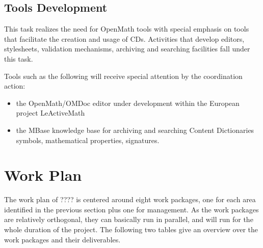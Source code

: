 \documentclass{euproposal}
\begin{document}
\subsection{Tools Development}\label{tools}

This task realizes the need for OpenMath tools with special emphasis
on tools that facilitate the creation and usage of CDs. Activities
that develop editors, stylesheets, validation mechanisms, archiving
and searching facilities fall under this task.

Tools such as the following will receive special attention by the
coordination action: 
\begin{itemize}
\item the OpenMath/OMDoc editor under development within the European project
  LeActiveMath
\item the MBase knowledge base for archiving and searching Content
  Dictionaries symbols, mathematical properties, signatures.
\end{itemize}
\section{Work Plan}

The work plan of ???? is centered around eight work packages, one for each area
identified in the previous section plus one for management. As the work packages
are relatively orthogonal, they can basically run in parallel, and will run for
the whole duration of the project. The
following two tables give an overview over the work packages and their
deliverables.
\end{document}
